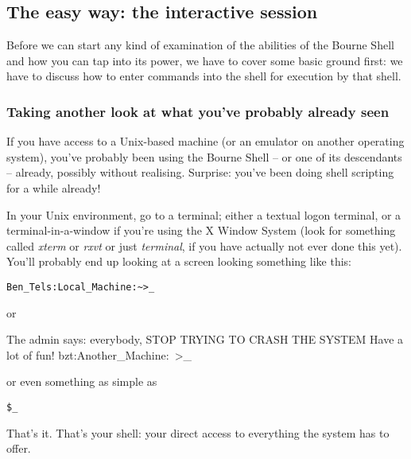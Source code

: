 \subsection{The easy way: the interactive session}
Before we can start any kind of examination of the abilities of the Bourne
Shell and how you can tap into its power, we have to cover some basic ground
first: we have to discuss how to enter commands into the shell for execution by
that shell.

\subsubsection{Taking another look at what you've probably already seen}
If you have access to a Unix-based machine (or an emulator on another operating
system), you've probably been using the Bourne Shell -- or one of its
descendants -- already, possibly without realising. Surprise: you've been doing
shell scripting for a while already!

In your Unix environment, go to a terminal; either a textual logon terminal, or
a terminal-in-a-window if you're using the X Window System (look for something
called \textit{xterm} or \textit{rxvt} or just \textit{terminal}, if you have
actually not ever done this yet). You'll probably end up looking at a screen
looking something like this:
\scriptsize
\begin{verbatim}
Ben_Tels:Local_Machine:~>_
\end{verbatim}
\normalsize
or
 
The admin says: everybody, STOP TRYING TO CRASH THE SYSTEM Have a lot of fun!
bzt:Another\_Machine:~>\_

or even something as simple as
\scriptsize
\begin{verbatim}
$_
\end{verbatim}
\normalsize

That's it. That's your shell: your direct access to everything the system has
to offer.

